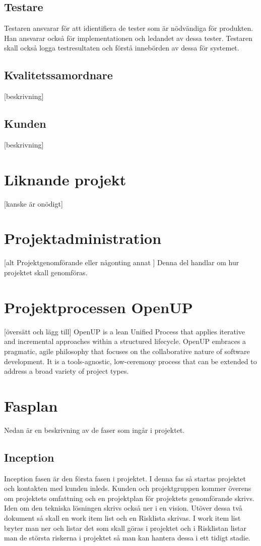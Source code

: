 \subsection*{Testare}
Testaren ansvarar för att idientifiera de tester som är nödvändiga för produkten. Han ansvarar också för implementationen och ledandet av dessa tester. Testaren skall också logga testresultaten och förstå innebörden av dessa för systemet.

\subsection*{Kvalitetssamordnare}
[beskrivning]

\subsection*{Kunden}
[beskrivning]

\section{Liknande projekt}
[kanske är onödigt]

\section{Projektadministration}
[alt Projektgenomförande eller någonting annat ]
Denna del handlar om hur projektet skall genomföras.

\section{Projektprocessen OpenUP}
[översätt och lägg till]
OpenUP is a lean Unified Process that applies iterative and incremental approaches within a structured lifecycle. OpenUP embraces a pragmatic, agile philosophy that focuses on the collaborative nature of software development. It is a tools-agnostic, low-ceremony process that can be extended to address a broad variety of project types.

\section{Fasplan}
Nedan är en beskrivning av de faser som ingår i projektet.

\subsection*{Inception}
Inception fasen är den första fasen i projektet. I denna fas så startas projektet och kontakten med kunden inleds. Kunden och projektgruppen kommer överens om projektets omfattning och en projektplan för projektets genomförande skrivs. Iden om den tekniska lösningen skrivs också ner i en vision. Utöver dessa två dokument så skall en work item list och en Risklista skrivas. I work item list bryter man ner och listar det som skall göras i projektet och i Risklistan listar man de största riskerna i projektet så man kan hantera dessa i ett tidigt stadie.

